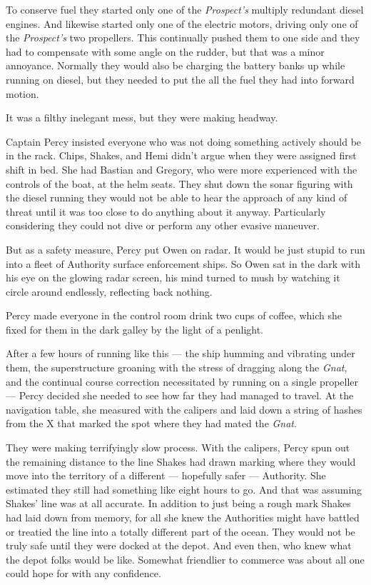 \documentclass[]{scrbook}
\begin{document}
To conserve fuel they started only one of the \emph{Prospect's} multiply
redundant diesel engines. And likewise started only one of the electric
motors, driving only one of the \emph{Prospect's} two propellers. This
continually pushed them to one side and they had to compensate with some
angle on the rudder, but that was a minor annoyance. Normally they would
also be charging the battery banks up while running on diesel, but they
needed to put the all the fuel they had into forward motion.

It was a filthy inelegant mess, but they were making headway.

Captain Percy insisted everyone who was not doing something actively
should be in the rack. Chips, Shakes, and Hemi didn't argue when they
were assigned first shift in bed. She had Bastian and Gregory, who were
more experienced with the controls of the boat, at the helm seats. They
shut down the sonar figuring with the diesel running they would not be
able to hear the approach of any kind of threat until it was too close
to do anything about it anyway. Particularly considering they could not
dive or perform any other evasive maneuver.

But as a safety measure, Percy put Owen on radar. It would be just
stupid to run into a fleet of Authority surface enforcement ships. So
Owen sat in the dark with his eye on the glowing radar screen, his mind
turned to mush by watching it circle around endlessly, reflecting back
nothing.

Percy made everyone in the control room drink two cups of coffee, which
she fixed for them in the dark galley by the light of a penlight.

After a few hours of running like this --- the ship humming and
vibrating under them, the superstructure groaning with the stress of
dragging along the \emph{Gnat}, and the continual course correction
necessitated by running on a single propeller --- Percy decided she
needed to see how far they had managed to travel. At the navigation
table, she measured with the calipers and laid down a string of hashes
from the X that marked the spot where they had mated the \emph{Gnat}.

They were making terrifyingly slow process. With the calipers, Percy
spun out the remaining distance to the line Shakes had drawn marking
where they would move into the territory of a different --- hopefully
safer --- Authority. She estimated they still had something like eight
hours to go. And that was assuming Shakes' line was at all accurate. In
addition to just being a rough mark Shakes had laid down from memory,
for all she knew the Authorities might have battled or treatied the line
into a totally different part of the ocean. They would not be truly safe
until they were docked at the depot. And even then, who knew what the
depot folks would be like. Somewhat friendlier to commerce was about all
one could hope for with any confidence.
\end{document}
